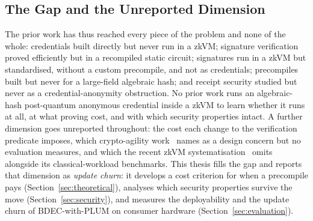 \subsection{The Gap and the Unreported Dimension}\label{ssec:gap}
The prior work has thus reached every piece of the problem and none of the whole: credentials built directly but never run in a zkVM; signature verification proved efficiently but in a recompiled static circuit; signatures run in a zkVM but standardised, without a custom precompile, and not as credentials; precompiles built but never for a large-field algebraic hash; and receipt security studied but never as a credential-anonymity obstruction. No prior work runs an algebraic-hash post-quantum anonymous credential inside a zkVM to learn whether it runs at all, at what proving cost, and with which security properties intact. A further dimension goes unreported throughout: the cost each change to the verification predicate imposes, which crypto-agility work~\cite{ott2019cryptoagility} names as a design concern but no evaluation measures, and which the recent zkVM systematisation~\cite{yang2026sokzkvm} omits alongside its classical-workload benchmarks. This thesis fills the gap and reports that dimension as \emph{update churn}: it develops a cost criterion for when a precompile pays (Section~\ref{sec:theoretical}), analyses which security properties survive the move (Section~\ref{sec:security}), and measures the deployability and the update churn of BDEC-with-PLUM on consumer hardware (Section~\ref{sec:evaluation}).
